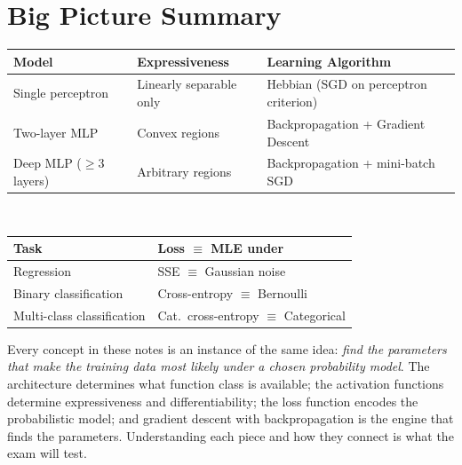 \documentclass[11pt,a4paper]{article}
\begin{document}
\section{Big Picture Summary}

\begin{tcolorbox}[colback=AlgoPurpleBg,colframe=AlgoPurple,boxrule=1pt,arc=4pt,
  title={\bfseries\color{white} ANN/DL Concepts Overview},
  attach boxed title to top left={yshift=-2mm,xshift=4mm},
  boxed title style={colback=AlgoPurple,rounded corners,boxrule=0pt}]
\begin{tabular}{@{}lll@{}}
\toprule
\textbf{Model} & \textbf{Expressiveness} & \textbf{Learning Algorithm} \\
\midrule
Single perceptron & Linearly separable only & Hebbian (SGD on perceptron criterion) \\
Two-layer MLP & Convex regions & Backpropagation + Gradient Descent \\
Deep MLP ($\geq 3$ layers) & Arbitrary regions & Backpropagation + mini-batch SGD \\
\bottomrule
\end{tabular}\\[8pt]
\begin{tabular}{@{}ll@{}}
\toprule
\textbf{Task} & \textbf{Loss $\equiv$ MLE under} \\
\midrule
Regression & SSE $\equiv$ Gaussian noise \\
Binary classification & Cross-entropy $\equiv$ Bernoulli \\
Multi-class classification & Cat.\ cross-entropy $\equiv$ Categorical \\
\bottomrule
\end{tabular}
\end{tcolorbox}

\begin{insightbox}
Every concept in these notes is an instance of the same idea: \emph{find the parameters that make the training data most likely under a chosen probability model}. The architecture determines what function class is available; the activation functions determine expressiveness and differentiability; the loss function encodes the probabilistic model; and gradient descent with backpropagation is the engine that finds the parameters. Understanding each piece and how they connect is what the exam will test.
\end{insightbox}
\end{document}
